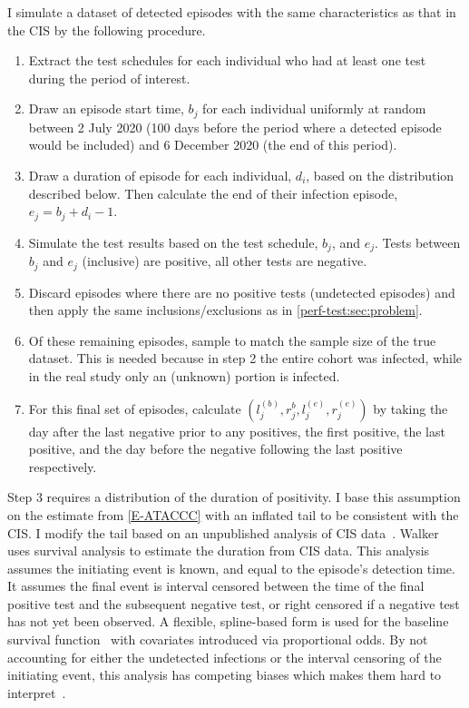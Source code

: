 \documentclass[thesis.tex]{subfiles}
\begin{document}
I simulate a dataset of detected episodes with the same characteristics as that in the CIS by the following procedure.
\begin{enumerate}
    \item Extract the test schedules for each individual who had at least one test during the period of interest.
    \item Draw an episode start time, $b_{j}$ for each individual uniformly at random between 2 July 2020 (100 days before the period where a detected episode would be included) and 6 December 2020 (the end of this period).
    \item Draw a duration of episode for each individual, $d_i$, based on the distribution described below. Then calculate the end of their infection episode, $e_{j} = b_{j} + d_i - 1$.
    \item Simulate the test results based on the test schedule, $b_{j}$, and $e_{j}$. Tests between $b_{j}$ and $e_{j}$ (inclusive) are positive, all other tests are negative.
    \item Discard episodes where there are no positive tests (\ie undetected episodes) and then apply the same inclusions/exclusions as in \cref{perf-test:sec:problem}.
    \item Of these remaining episodes, sample  to match the sample size of the true dataset. This is needed because in step 2 the entire cohort was infected, while in the real study only an (unknown) portion is infected.
    \item For this final set of episodes, calculate $(l_j^{(b)}, r_j^{b}, l_j^{(e)}, r_j^{(e)})$ by taking the day after the last negative prior to any positives, the first positive, the last positive, and the day before the negative following the last positive respectively.
\end{enumerate}

Step 3 requires a distribution of the duration of positivity.
I base this assumption on the estimate from \cref{E-ATACCC} with an inflated tail to be consistent with the CIS.
I modify the tail based on an unpublished analysis of CIS data~.
Walker uses survival analysis to estimate the duration from CIS data.
This analysis assumes the initiating event is known, and equal to the episode’s detection time. 
It assumes the final event is interval censored between the time of the final positive test and the subsequent negative test, or right censored if a negative test has not yet been observed.
A flexible, spline-based form is used for the baseline survival function~\autocite{roystonSTPM,roystonFlexible} with covariates introduced via proportional odds.
By not accounting for either the undetected infections or the interval censoring of the initiating event, this analysis has competing biases which makes them hard to interpret~\autocite{cisMethodsONS}.
\end{document}
